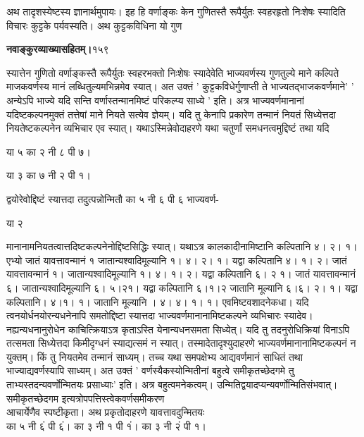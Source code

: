 \documentclass[11pt, openany]{book}
\begin{document}
\begin{sloppypar}
\hangindent=0.2in \hspace{0.2in}अथ तादृशस्येष्टस्य ज्ञानार्थमुपायः। इह हि वर्णाङ्कः केन गुणितस्तै रूपैर्युतः स्वहरहृतो निःशेषः स्यादिति विचारः कुट्टके पर्यवस्यति। अथ कुट्टकविधिना यो गुण
\end{sloppypar}
\thispagestyle{empty}
\newpage

\onehalfspacing
\hspace{2in}\textbf{नवाङ्कुरव्याख्यासहितम्।}\hspace{2in}१५९

\vspace{5mm}

\begin{sloppypar}
\hangindent=0.2in स्यात्तेन गुणितो वर्णाङ्कस्तै रूपैर्युतः स्वहरभक्तो निःशेषः स्यादेवेति भाज्यवर्णस्य गुणतुल्ये माने कल्पिते माजकवर्णस्य मानं लब्धितुल्यमभिन्नमेव स्यात्। अत उक्तं ' कुट्टकविधेर्गुणाप्ती ते भाज्यतद्भाजकवर्णमाने' ' अन्येऽपि भाज्ये यदि सन्ति वर्णास्तन्मानमिष्टं परिकल्प्य साध्ये ' इति। अत्र भाज्यवर्णमानानां यदिष्टकल्पनमुक्तं तत्तेषां माने नियते सत्येव ज्ञेयम्। यदि तु केनापि प्रकारेण तन्मानं नियतं सिध्येत्तदा नियतेष्टकल्पनेन व्यभिचार एव स्यात्। यथाऽस्मिन्नेवोदाहरणे यथा चतुर्णां समधनत्वमुद्दिष्टं तथा यदि

\begin{center}
या ५ का २ नी ८ पी ७।

या ३ का ७ नी २ पी १।
\end{center}

\hangindent=0.2in \hspace{0.2in}द्वयोरेवोद्दिष्टं स्यात्तदा तदुत्पन्नोन्मितौ का ५ नी ६ पी ६ भाज्यवर्ण-

\hspace{2.85in}या २

\hangindent=0.2in मानानामनियतत्वात्तदिष्टकल्पनेनोद्दिष्टसिद्धिः स्यात्। यथाऽत्र कालकादीनामिष्टानि कल्पितानि ४। २। १। एभ्यो जातं यावत्तावन्मानं १ जातान्यश्वादिमूल्यानि १। ४। २। १। यद्वा कल्पितानि ४। १। २। जातं यावत्तावन्मानं १। जातान्यश्वादिमूल्यानि १। ४। १। २। यद्वा कल्पितानि ६। २ १। जातं यावत्तावन्मानं ६। जातान्यश्वादिमूल्यानि ६। ५।२१। यद्वा कल्पितानि ६।१।२ जातानि मूल्यानि ६।६। २। १। यद्वा कल्पितानि। ४।१। १। जातानि मूल्यानि । ४। ४। १। १। एवमिष्टवशादनेकधा। यदि त्वनयोर्धनयोरन्यधनेनापि समतोद्दिष्टा स्यात्तदा भाज्यवर्णमानानामिष्टकल्पने व्यभिचारः स्यादेव। नह्यन्यधनानुरोधेन काचित्क्रियाऽत्र कृताऽस्ति येनान्यधनसमता सिध्येत्। यदि तु तदनुरोधिक्रियां विनाऽपि तत्समता सिध्येत्तदा किमीदृग्धनं स्याद्यत्समं न स्यात्। तस्मादेतादृश्युदाहरणे भाज्यवर्णमानानामिष्टकल्पनं न युक्तम्। किं तु नियतमेव तन्मानं साध्यम्। तच्च यथा समपक्षेभ्य आद्यवर्णमानं साधितं तथा भाज्याद्यवर्णस्यापि साध्यम्। अत उक्तं ' वर्णस्यैकस्योन्मितीनां बहुत्वे समीकृतच्छेदगमे तु ताभ्यस्तदन्यवर्णोन्मितयः प्रसाध्याः' इति। अत्र बहुत्वमनेकत्वम्। उन्मितिद्वयादप्यन्यवर्णोन्मितिसंभवात्। समीकृतच्छेदगम इत्यत्रोपपत्तिस्त्वेकवर्णसमीकरण \\आचार्येणैव स्पष्टीकृता। अथ प्रकृतोदाहरणे यावत्तावदुन्मितयः\\ का ५ नी ६ं पी ६ं। का ३ नी १ पी १ं। का ३ नी २ं पी १।


\end{sloppypar}
\end{document}
